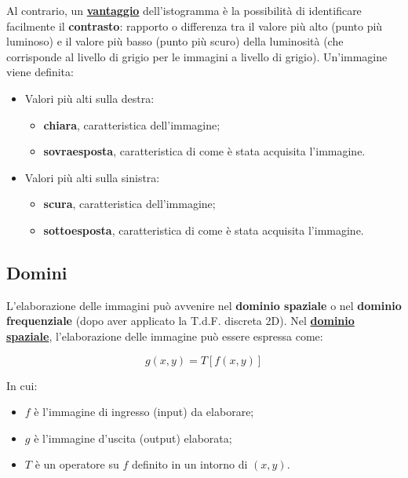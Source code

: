 \documentclass[a4paper]{article}
\begin{document}
	\noindent
	Al contrario, un \textcolor{Green4}{\textbf{\underline{vantaggio}}} dell'istogramma è la possibilità di identificare facilmente il \textcolor{Red3}{\textbf{contrasto}}: rapporto o differenza tra il valore più alto (punto più luminoso) e il valore più basso (punto più scuro) della luminosità (che corrisponde al livello di grigio per le immagini a livello di grigio).\newline
	Un'immagine viene definita:
	
	\begin{itemize}
		\item Valori più alti sulla destra:
		\begin{itemize}
			\item \textbf{chiara}, caratteristica dell'immagine;
			\item \textbf{sovraesposta}, caratteristica di come è stata acquisita l'immagine.
		\end{itemize}
	
		\item Valori più alti sulla sinistra:
		\begin{itemize}
			\item \textbf{scura}, caratteristica dell'immagine;
			\item \textbf{sottoesposta}, caratteristica di come è stata acquisita l'immagine.
		\end{itemize}
	\end{itemize}

	\newpage
	
	\subsection{Domini}
	
	L'elaborazione delle immagini può avvenire nel \textbf{dominio spaziale} o nel \textbf{dominio frequenziale} (dopo aver applicato la T.d.F. discreta 2D). Nel \textcolor{Red3}{\textbf{\underline{dominio spaziale}}}, l'elaborazione delle immagine può essere espressa come:
	
	\begin{equation*}
		g\left(x,y\right) = T\left[f\left(x,y\right)\right]
	\end{equation*}

	\noindent
	In cui:
	
	\begin{itemize}[label=-]
		\item $f$ è l'immagine di ingresso (input) da elaborare;
		\item $g$ è l'immagine d'uscita (output) elaborata;
		\item $T$ è un operatore su $f$ definito in un intorno di $\left(x,y\right)$.
	\end{itemize}
\end{document}

